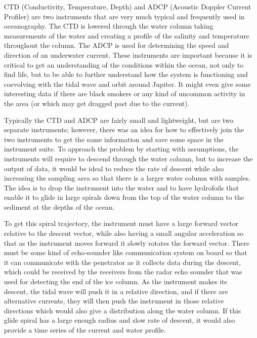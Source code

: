 

CTD (Conductivity, Temperature, Depth) and ADCP (Acoustic Doppler Current Profiler) are two instruments that are very much typical and frequently used in oceanography. The CTD is lowered through the water column taking measurements of the water and creating a profile of the salinity and temperature throughout the column. The ADCP is used for determining the speed and direction of an underwater current. These instruments are important because it is critical to get an understanding of the conditions within the ocean, not only to find life, but to be able to further understand how the system is functioning and coevolving with the tidal wave and orbit around Jupiter. It might even give some interesting data if there are black smokers or any kind of uncommon activity in the area (or which may get dragged past due to the current).

Typically the CTD and ADCP are fairly small and lightweight, but are two separate instruments; however, there was an idea for how to effectively join the two instruments to get the same information and save some space in the instrument suite. To approach the problem by starting with assumptions, the instruments will require to descend through the water column, but to increase the output of data, it would be ideal to reduce the rate of descent while also increasing the sampling area so that there is a larger water column with samples. The idea is to drop the instrument into the water and to have hydrofoils that enable it to glide in large spirals down from the top of the water column to the sediment at the depths of the ocean. 

To get this spiral trajectory, the instrument must have a large forward vector relative to the descent vector, while also having a small angular acceleration so that as the instrument moves forward it slowly rotates the forward vector. There must be some kind of echo-sounder like communication system on board so that it can communicate with the penetrator as it collects data during the descent, which could be received by the receivers from the radar echo sounder that was used for detecting the end of the ice column. As the instrument makes its descent, the tidal wave will push it in a relative direction, and if there are alternative currents, they will then push the instrument in those relative directions which would also give a distribution along the water column. If this glide spiral has a large enough radius and slow rate of descent, it would also provide a time series of the current and water profile.

